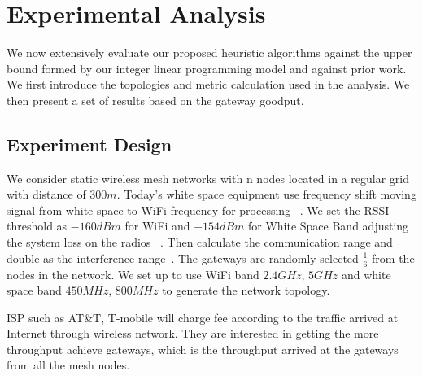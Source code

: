 \section{Experimental Analysis}
\label{sec:experimentdesign}

We now extensively evaluate our proposed heuristic algorithms against the upper bound formed by our
integer linear programming model and against prior work. We first introduce the topologies and
metric calculation used in the analysis.  We then present a set of results based on the gateway 
goodput.




\subsection{Experiment Design}
\label{subsec:design}
We consider static wireless mesh networks with n nodes located in a regular grid with distance of $300m$. 
Today's white space equipment use frequency shift moving signal from white space to WiFi frequency for processing ~\cite{Ubnt}.
We set the RSSI threshold as $-160dBm$ for WiFi and $-154dBm$ for White Space Band adjusting the system loss on the radios ~\cite{cui2013leveraging}.
Then calculate the communication range and double as the interference range~\cite{raniwala2005architecture}. The gateways are randomly selected $\frac{1}{6}$ from the nodes in the network.
We set up to use WiFi band $2.4 GHz$, $5 GHz$ and white space band $450 MHz$, $800 MHz$ to generate the network topology.

ISP such as AT\&T, T-mobile will charge fee according to the traffic arrived at Internet through wireless network. 
They are interested in getting the more throughput achieve gateways, which is the throughput arrived at the gateways from all the mesh nodes. 

